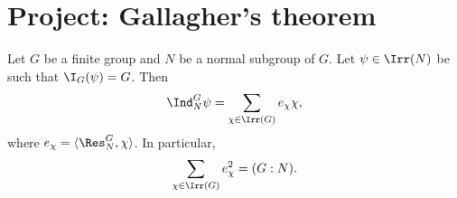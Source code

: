 \section{Project: Gallagher's theorem}

\begin{lemma}
    \label{lem:gallagher1}
    Let $G$ be a finite group and 
    $N$ be a normal subgroup of $G$. Let $\psi\in\Irr(N)$ be such that
    $\I_G(\psi)=G$. Then
    \[
    \Ind_N^G\psi=\sum_{\chi\in\Irr(G)}e_\chi\chi,
    \]
    where $e_\chi=\langle\Res_N^G,\chi\rangle$.
    In particular, 
    \[
    \sum_{\chi\in\Irr(G)}e_\chi^2=(G:N).
    \]
\end{lemma}
